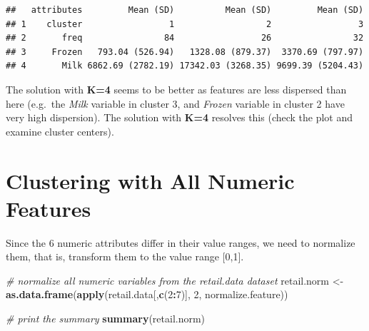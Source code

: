\documentclass[]{article}
\newenvironment{Shaded}{\begin{snugshade}}{\end{snugshade}}
\newcommand{\KeywordTok}[1]{\textcolor[rgb]{0.13,0.29,0.53}{\textbf{#1}}}
\newcommand{\DataTypeTok}[1]{\textcolor[rgb]{0.13,0.29,0.53}{#1}}
\newcommand{\DecValTok}[1]{\textcolor[rgb]{0.00,0.00,0.81}{#1}}
\newcommand{\StringTok}[1]{\textcolor[rgb]{0.31,0.60,0.02}{#1}}
\newcommand{\CommentTok}[1]{\textcolor[rgb]{0.56,0.35,0.01}{\textit{#1}}}
\newcommand{\OperatorTok}[1]{\textcolor[rgb]{0.81,0.36,0.00}{\textbf{#1}}}
\newcommand{\NormalTok}[1]{#1}
\begin{document}
\begin{Shaded}
\end{Shaded}

\begin{verbatim}
##   attributes         Mean (SD)          Mean (SD)         Mean (SD)
## 1    cluster                 1                  2                 3
## 2       freq                84                 26                32
## 3     Frozen   793.04 (526.94)   1328.08 (879.37)  3370.69 (797.97)
## 4       Milk 6862.69 (2782.19) 17342.03 (3268.35) 9699.39 (5204.43)
\end{verbatim}

The solution with \textbf{K=4} seems to be better as features are less
dispersed than here (e.g.~the \emph{Milk} variable in cluster 3, and
\emph{Frozen} variable in cluster 2 have very high dispersion). The
solution with \textbf{K=4} resolves this (check the plot and examine
cluster centers).

\section{Clustering with All Numeric
Features}\label{clustering-with-all-numeric-features}

Since the 6 numeric attributes differ in their value ranges, we need to
normalize them, that is, transform them to the value range {[}0,1{]}.

\begin{Shaded}
\begin{Highlighting}[]
\CommentTok{# normalize all numeric variables from the retail.data dataset}
\NormalTok{retail.norm <-}\StringTok{ }\KeywordTok{as.data.frame}\NormalTok{(}\KeywordTok{apply}\NormalTok{(retail.data[,}\KeywordTok{c}\NormalTok{(}\DecValTok{2}\OperatorTok{:}\DecValTok{7}\NormalTok{)], }\DecValTok{2}\NormalTok{, normalize.feature))}

\CommentTok{# print the summary}
\KeywordTok{summary}\NormalTok{(retail.norm)}
\end{Highlighting}
\end{Shaded}
\end{document}
